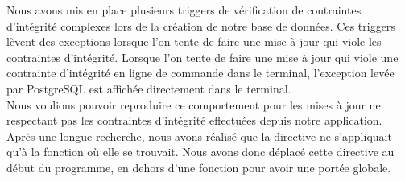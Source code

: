 Nous avons mis en place plusieurs triggers de vérification de contraintes d'intégrité complexes lors de la création de notre base de données. Ces triggers lèvent des exceptions lorsque l'on tente de faire une mise à jour qui viole les contraintes d'intégrité. Lorsque l'on tente de faire une mise à jour qui viole une contrainte d'intégrité en ligne de commande dans le terminal, l'exception levée par PostgreSQL est affichée directement dans le terminal.\\

Nous voulions pouvoir reproduire ce comportement pour les mises à jour ne respectant pas les contraintes d'intégrité effectuées depuis notre application. Après une longue recherche, nous avons réalisé que la directive  ne s'appliquait qu'à la fonction où elle se trouvait. Nous avons donc déplacé cette directive au début du programme, en dehors d'une fonction pour avoir une portée globale.